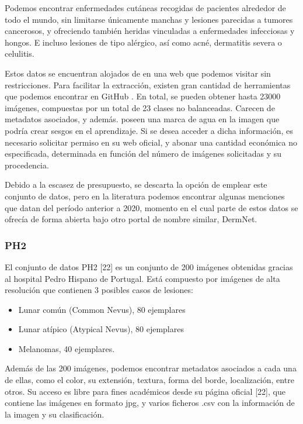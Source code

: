 Podemos encontrar enfermedades cutáneas recogidas de pacientes alrededor de todo el mundo, sin limitarse únicamente manchas  y lesiones parecidas a tumores cancerosos, y ofreciendo también heridas vinculadas a enfermedades infecciosas y hongos.  E incluso lesiones de tipo alérgico, así como acné, dermatitis severa o celulitis.

Estos datos se encuentran alojados de en una web que podemos visitar sin restricciones. Para facilitar la extracción,  existen gran cantidad de herramientas que podemos encontrar en GitHub \cite{githubdermnet}. En total, se pueden obtener hasta 23000 imágenes, compuestas por un total de 23 clases no balanceadas. Carecen de metadatos asociados, y además. poseen una marca de agua en la imagen que podría crear sesgos en el aprendizaje. Si se desea acceder a dicha información, es necesario solicitar permiso en su web oficial, y abonar una cantidad económica no especificada, determinada en función del  número de imágenes solicitadas y su procedencia.

Debido a la escasez de presupuesto, se descarta la opción de emplear este conjunto de datos, pero en la literatura podemos encontrar algunas menciones que datan del período anterior a 2020, momento en el cual parte de estos datos se ofrecía de forma abierta bajo otro portal de nombre similar, DermNet.


\subsubsection{ PH2}
El conjunto de datos PH2 [22] es un conjunto de 200 imágenes obtenidas gracias al hospital Pedro Hispano de Portugal. Está compuesto por imágenes de alta resolución que contienen 3 posibles casos de lesiones:
\begin{itemize}
	\item Lunar común (Common Nevus), 80 ejemplares
	\item Lunar atípico (Atypical Nevus), 80 ejemplares
	\item Melanomas, 40 ejemplares.
\end{itemize}

Además de las 200 imágenes, podemos encontrar metadatos asociados a cada una de ellas, como el color, su extensión, textura, forma del borde, localización, entre otros.
Su acceso es libre para fines académicos desde su página oficial [22], que contiene las imágenes en formato jpg, y varios ficheros .csv con la información de la imagen y su clasificación.

